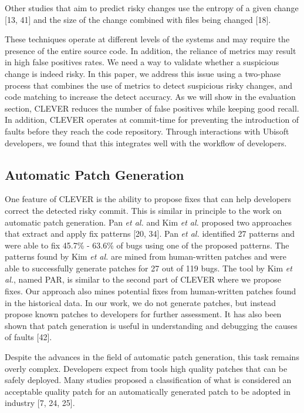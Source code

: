 \documentclass[sigconf]{acmart}
\begin{document}
Other studies that aim to predict risky changes use the entropy of a
given change [13, 41] and the size of the change combined with files
being changed [18].

These techniques operate at different levels of the systems and may
require the presence of the entire source code. In addition, the
reliance of metrics may result in high false positives rates. We need a
way to validate whether a suspicious change is indeed risky. In this
paper, we address this issue using a two-phase process that combines the
use of metrics to detect suspicious risky changes, and code matching to
increase the detect accuracy. As we will show in the evaluation section,
CLEVER reduces the number of false positives while keeping good recall.
In addition, CLEVER operates at commit-time for preventing the
introduction of faults before they reach the code repository. Through
interactions with Ubisoft developers, we found that this integrates well
with the workflow of developers.

\subsection{Automatic Patch
Generation}\label{automatic-patch-generation}

One feature of CLEVER is the ability to propose fixes that can help
developers correct the detected risky commit. This is similar in
principle to the work on automatic patch generation. Pan \emph{et al.}
and Kim \emph{et al.} proposed two approaches that extract and apply fix
patterns [20, 34]. Pan \emph{et al.} identified 27 patterns and were
able to fix 45.7\% - 63.6\% of bugs using one of the proposed patterns.
The patterns found by Kim \emph{et al.} are mined from human-written
patches and were able to successfully generate patches for 27 out of 119
bugs. The tool by Kim \emph{et al.}, named PAR, is similar to the second
part of CLEVER where we propose fixes. Our approach also mines potential
fixes from human-written patches found in the historical data. In our
work, we do not generate patches, but instead propose known patches to
developers for further assessment. It has also been shown that patch
generation is useful in understanding and debugging the causes of faults
[42].

Despite the advances in the field of automatic patch generation, this
task remains overly complex. Developers expect from tools high quality
patches that can be safely deployed. Many studies proposed a
classification of what is considered an acceptable quality patch for an
automatically generated patch to be adopted in industry [7, 24, 25].
\end{document}
